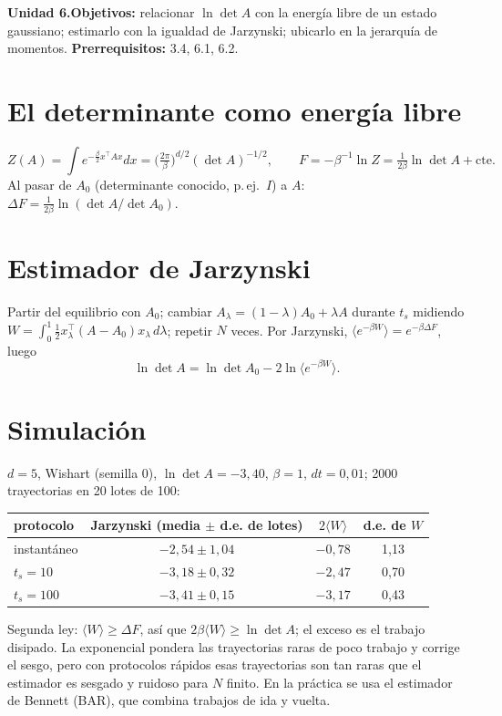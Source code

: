 \documentclass[11pt,a4paper]{article}
\begin{document}

\noindent\textbf{Unidad 6.}\quad\textbf{Objetivos:} relacionar $\ln\det A$ con la energía libre de un estado gaussiano; estimarlo con la igualdad de Jarzynski;
ubicarlo en la jerarquía de momentos.
\textbf{Prerrequisitos:} 3.4, 6.1, 6.2.

\section{El determinante como energía libre}
\[Z(A)=\int e^{-\frac\beta2x^\top Ax}dx=\Big(\tfrac{2\pi}\beta\Big)^{d/2}(\det A)^{-1/2},\qquad F=-\beta^{-1}\ln Z=\tfrac1{2\beta}\ln\det A+\text{cte}.\]
Al pasar de $A_0$ (determinante conocido, p.\,ej.\ $I$) a $A$: $\Delta F=\tfrac1{2\beta}\ln(\det A/\det A_0)$.

\section{Estimador de Jarzynski}
\begin{definicion}
Partir del equilibrio con $A_0$; cambiar $A_\lambda=(1-\lambda)A_0+\lambda A$ durante $t_s$ midiendo
$W=\int_0^1\tfrac12x_\lambda^\top(A-A_0)x_\lambda\,d\lambda$; repetir $N$ veces. Por Jarzynski, $\langle e^{-\beta W}\rangle=e^{-\beta\Delta F}$, luego
\[\ln\det A=\ln\det A_0-2\ln\big\langle e^{-\beta W}\big\rangle.\]
\end{definicion}

\section{Simulación \evS}
$d=5$, Wishart (semilla 0), $\ln\det A=-3{,}40$, $\beta=1$, $dt=0{,}01$; 2000 trayectorias en 20 lotes de 100:
\begin{center}\begin{tabular}{lccc}\toprule
protocolo & Jarzynski (media $\pm$ d.e. de lotes) & $2\langle W\rangle$ & d.e. de $W$\\\midrule
instantáneo & $-2{,}54\pm1{,}04$ & $-0{,}78$ & 1,13\\
$t_s=10$ & $-3{,}18\pm0{,}32$ & $-2{,}47$ & 0,70\\
$t_s=100$ & $-3{,}41\pm0{,}15$ & $-3{,}17$ & 0,43\\\bottomrule\end{tabular}\end{center}
Segunda ley: $\langle W\rangle\ge\Delta F$, así que $2\beta\langle W\rangle\ge\ln\det A$; el exceso es el trabajo disipado. La exponencial pondera las trayectorias
raras de poco trabajo y corrige el sesgo, pero con protocolos rápidos esas trayectorias son tan raras que el estimador es sesgado y ruidoso para $N$ finito.
En la práctica se usa el estimador de Bennett (BAR), que combina trabajos de ida y vuelta.
\end{document}
